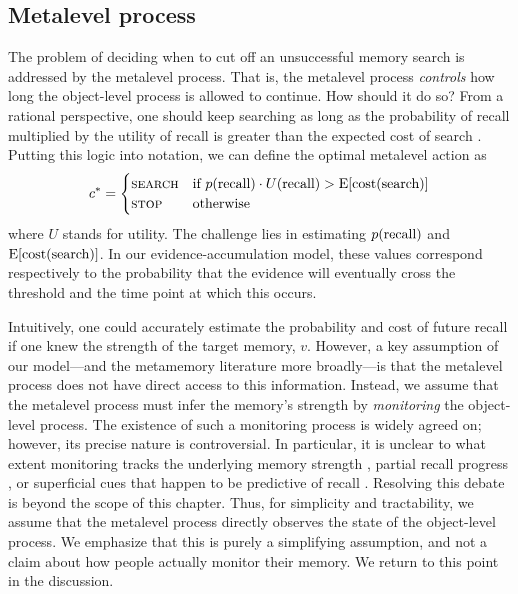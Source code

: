 \subsection{Metalevel process}
The problem of deciding when to cut off an unsuccessful memory search is addressed by the metalevel process. That is, the metalevel process \emph{controls} how long the object-level process is allowed to continue. How should it do so? From a rational perspective, one should keep searching as long as the probability of recall multiplied by the utility of recall is greater than the expected cost of search \citep{anderson1989human}. Putting this logic into notation, we can define the optimal metalevel action as
%
\begin{equation}\label{eq:anderson}
  c^* = \begin{cases}
    \textsc{search} & \text{if } p({\text{recall}}) \cdot U({\text{recall}}) > \operatorname*{E} [\text{cost}(\text{search})] \\
    \textsc{stop} & \text{otherwise}
  \end{cases}
\end{equation}
%
where $U$ stands for utility. The challenge lies in estimating $p({\text{recall}})$ and $\operatorname*{E}[\text{cost}(\text{search})]$. In our evidence-accumulation model, these values correspond respectively to the probability that the evidence will eventually cross the threshold and the time point at which this occurs. 

Intuitively, one could accurately estimate the probability and cost of future recall if one knew the strength of the target memory, $v$. However, a key assumption of our model---and the metamemory literature more broadly---is that the metalevel process does not have direct access to this information. Instead, we assume that the metalevel process must infer the memory's strength by \emph{monitoring} the object-level process. The existence of such a monitoring process is widely agreed on; however, its precise nature is controversial. In particular, it is unclear to what extent monitoring tracks the underlying memory strength \citep{hart1965memory}, partial recall progress \citep{koriat1993how}, or superficial cues that happen to be predictive of recall \citep{reder1992determines,schwartz1992cue}. Resolving this debate is beyond the scope of this chapter. Thus, for simplicity and tractability, we assume that the metalevel process directly observes the state of the object-level process. We emphasize that this is purely a simplifying assumption, and not a claim about how people actually monitor their memory. We return to this point in the discussion.

